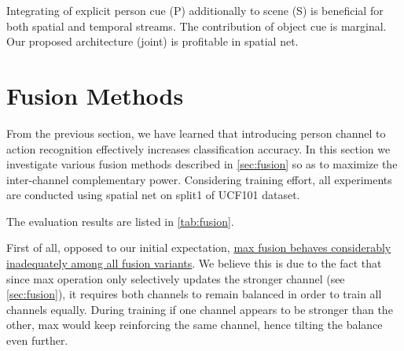 \begin{table}[h]
\centering
{}
\caption[Benefit of integrating explicit semantic structure]{Integrating of explicit person cue (P) additionally to scene (S) is beneficial for both spatial and temporal streams. The contribution of object cue is marginal. Our proposed architecture (joint) is profitable in spatial net.}\label{tab:channels}
\end{table}

\section{Fusion Methods}\label{sec:evalfusion}
From the previous section, we have learned that introducing person channel to action recognition effectively increases classification accuracy.
In this section we investigate various fusion methods described in \autoref{sec:fusion} so as to maximize the inter-channel complementary power.
Considering training effort, all experiments are conducted using spatial net on split1 of UCF101 dataset.

The evaluation results are listed in \autoref{tab:fusion}. 

First of all, opposed to our initial expectation, \ul{max fusion behaves considerably inadequately among all fusion variants}.
We believe this is due to the fact that since max operation only selectively updates the stronger channel (see \autoref{sec:fusion}), it requires both channels to remain balanced in order to train all channels equally. 
During training if one channel appears to be stronger than the other, max would keep reinforcing the same channel, hence tilting the balance even further.

